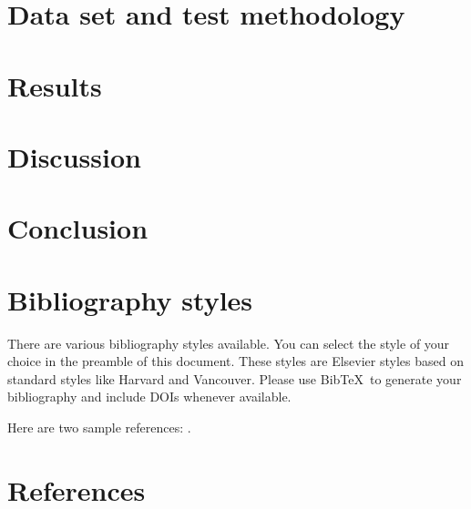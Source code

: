 \documentclass[5p]{elsarticle}
\begin{document}
\section{Data set and test methodology}


\section{Results}


\section{Discussion}


\section{Conclusion}



\section{Bibliography styles}

There are various bibliography styles available. You can select the style of your choice in the preamble of this document. These styles are Elsevier styles based on standard styles like Harvard and Vancouver. Please use Bib\TeX\ to generate your bibliography and include DOIs whenever available.

Here are two sample references: \cite{Feynman1963118,Dirac1953888}.

\section*{References}


\end{document}
